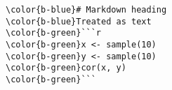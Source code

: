 \documentclass[class=minimal,border=0]{standalone}
\begin{document}
%
\begin{BVerbatim}[bgcolor=b-darkgrey]
\color{b-blue}# Markdown heading
\color{b-blue}Treated as text
\color{b-green}```r
\color{b-green}x <- sample(10)
\color{b-green}y <- sample(10)
\color{b-green}cor(x, y)
\color{b-green}```
\end{BVerbatim}
\end{document}
